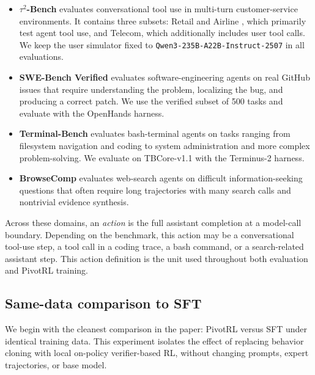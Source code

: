 \begin{itemize}
  \item \textbf{$\tau^2$-Bench} \citep{barres2025tau2bench} evaluates conversational tool use in multi-turn customer-service environments. It contains three subsets: Retail and Airline \citep{yao2024taubench}, which primarily test agent tool use, and Telecom, which additionally includes user tool calls. We keep the user simulator fixed to \texttt{Qwen3-235B-A22B-Instruct-2507} in all evaluations.

  \item \textbf{SWE-Bench Verified} \citep{jimenez2024swebench} evaluates software-engineering agents on real GitHub issues that require understanding the problem, localizing the bug, and producing a correct patch. We use the verified subset of 500 tasks and evaluate with the OpenHands harness.

  \item \textbf{Terminal-Bench} \citep{tbench_2025} evaluates bash-terminal agents on tasks ranging from filesystem navigation and coding to system administration and more complex problem-solving. We evaluate on TBCore-v1.1 with the Terminus-2 harness.

  \item \textbf{BrowseComp} \citep{wei2025browsecompsimplechallengingbenchmark} evaluates web-search agents on difficult information-seeking questions that often require long trajectories with many search calls and nontrivial evidence synthesis.
\end{itemize}

Across these domains, an \emph{action} is the full assistant completion at a model-call boundary. Depending on the benchmark, this action may be a conversational tool-use step, a tool call in a coding trace, a bash command, or a search-related assistant step. This action definition is the unit used throughout both evaluation and PivotRL training.

\subsection{Same-data comparison to SFT}
\label{sec:same_data_sft}

We begin with the cleanest comparison in the paper: PivotRL versus SFT under identical training data. This experiment isolates the effect of replacing behavior cloning with local on-policy verifier-based RL, without changing prompts, expert trajectories, or base model.

